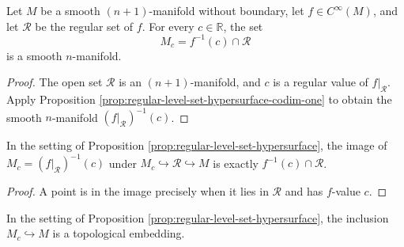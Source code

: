 \begin{proposition}
\label{prop:regular-level-set-hypersurface}





Let $M$ be a smooth $(n+1)$-manifold without boundary, let
$f\in C^\infty(M)$, and let $\mathcal R$ be the regular set of $f$. For every
$c\in\mathbb R$, the set
\[
M_c=f^{-1}(c)\cap\mathcal R
\]
is a smooth $n$-manifold.
\end{proposition}

\begin{proof}

\sketch The open set $\mathcal R$ is an $(n+1)$-manifold, and $c$ is a regular value
of $f|_{\mathcal R}$. Apply Proposition
\ref{prop:regular-level-set-hypersurface-codim-one} to obtain the smooth
$n$-manifold $(f|_{\mathcal R})^{-1}(c)$.
\end{proof}

\begin{lemma}
\label{lem:regular-part-image}





In the setting of Proposition \ref{prop:regular-level-set-hypersurface}, the image
of $M_c=(f|_{\mathcal R})^{-1}(c)$ under $M_c\hookrightarrow\mathcal R\hookrightarrow M$
is exactly $f^{-1}(c)\cap\mathcal R$.
\end{lemma}

\begin{proof}

\sketch A point is in the image precisely when it lies in $\mathcal R$ and has
$f$-value $c$.
\end{proof}

\begin{lemma}
\label{lem:regular-part-embedded}





In the setting of Proposition \ref{prop:regular-level-set-hypersurface}, the inclusion
$M_c\hookrightarrow M$ is a topological embedding.
\end{lemma}

